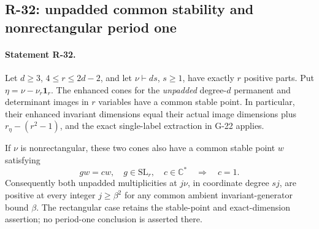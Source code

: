 \subsection{R-32: unpadded common stability and nonrectangular period one}

\paragraph{Statement R-32.}
Let $d\geq3$, $4\leq r\leq2d-2$, and let
$\nu\vdash ds$, $s\geq1$, have exactly $r$ positive parts.
Put $\eta=\nu-\nu_r\mathbf1_r$. The enhanced cones for the
\emph{unpadded} degree-$d$ permanent and determinant images
in $r$ variables have a common stable point. In particular,
their enhanced invariant dimensions equal their actual
image dimensions plus $r_\eta-(r^2-1)$, and the exact
single-label extraction in G-22 applies.

If $\nu$ is nonrectangular, these two cones also have a common
stable point $w$ satisfying
\[
 gw=cw,\quad g\in\mathrm{SL}_r,\quad c\in\mathbb C^*
             \quad\Longrightarrow\quad c=1.
\]
Consequently both unpadded multiplicities at $j\nu$, in
coordinate degree $sj$, are positive at every integer
$j\geq\beta^2$ for any common ambient invariant-generator
bound $\beta$. The rectangular case retains the stable-point
and exact-dimension assertion; no period-one conclusion is
asserted there.

